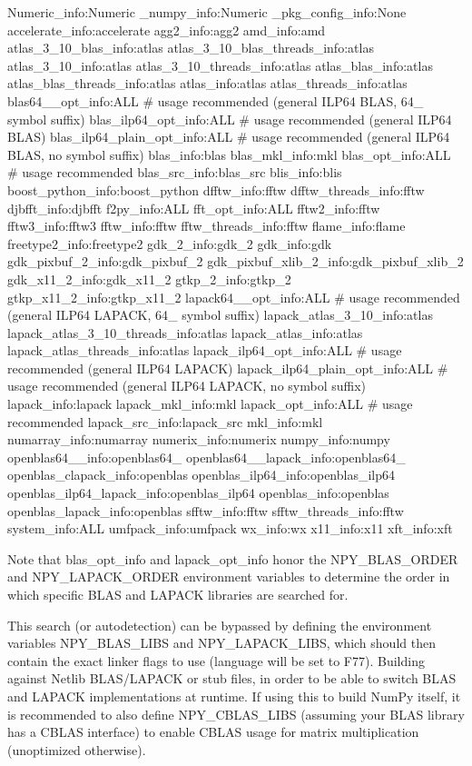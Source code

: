 \begin{DoxyVerb}
Numeric_info:Numeric
_numpy_info:Numeric
_pkg_config_info:None
accelerate_info:accelerate
agg2_info:agg2
amd_info:amd
atlas_3_10_blas_info:atlas
atlas_3_10_blas_threads_info:atlas
atlas_3_10_info:atlas
atlas_3_10_threads_info:atlas
atlas_blas_info:atlas
atlas_blas_threads_info:atlas
atlas_info:atlas
atlas_threads_info:atlas
blas64__opt_info:ALL               # usage recommended (general ILP64 BLAS, 64_ symbol suffix)
blas_ilp64_opt_info:ALL            # usage recommended (general ILP64 BLAS)
blas_ilp64_plain_opt_info:ALL      # usage recommended (general ILP64 BLAS, no symbol suffix)
blas_info:blas
blas_mkl_info:mkl
blas_opt_info:ALL                  # usage recommended
blas_src_info:blas_src
blis_info:blis
boost_python_info:boost_python
dfftw_info:fftw
dfftw_threads_info:fftw
djbfft_info:djbfft
f2py_info:ALL
fft_opt_info:ALL
fftw2_info:fftw
fftw3_info:fftw3
fftw_info:fftw
fftw_threads_info:fftw
flame_info:flame
freetype2_info:freetype2
gdk_2_info:gdk_2
gdk_info:gdk
gdk_pixbuf_2_info:gdk_pixbuf_2
gdk_pixbuf_xlib_2_info:gdk_pixbuf_xlib_2
gdk_x11_2_info:gdk_x11_2
gtkp_2_info:gtkp_2
gtkp_x11_2_info:gtkp_x11_2
lapack64__opt_info:ALL             # usage recommended (general ILP64 LAPACK, 64_ symbol suffix)
lapack_atlas_3_10_info:atlas
lapack_atlas_3_10_threads_info:atlas
lapack_atlas_info:atlas
lapack_atlas_threads_info:atlas
lapack_ilp64_opt_info:ALL          # usage recommended (general ILP64 LAPACK)
lapack_ilp64_plain_opt_info:ALL    # usage recommended (general ILP64 LAPACK, no symbol suffix)
lapack_info:lapack
lapack_mkl_info:mkl
lapack_opt_info:ALL                # usage recommended
lapack_src_info:lapack_src
mkl_info:mkl
numarray_info:numarray
numerix_info:numerix
numpy_info:numpy
openblas64__info:openblas64_
openblas64__lapack_info:openblas64_
openblas_clapack_info:openblas
openblas_ilp64_info:openblas_ilp64
openblas_ilp64_lapack_info:openblas_ilp64
openblas_info:openblas
openblas_lapack_info:openblas
sfftw_info:fftw
sfftw_threads_info:fftw
system_info:ALL
umfpack_info:umfpack
wx_info:wx
x11_info:x11
xft_info:xft

Note that blas_opt_info and lapack_opt_info honor the NPY_BLAS_ORDER
and NPY_LAPACK_ORDER environment variables to determine the order in which
specific BLAS and LAPACK libraries are searched for.

This search (or autodetection) can be bypassed by defining the environment
variables NPY_BLAS_LIBS and NPY_LAPACK_LIBS, which should then contain the
exact linker flags to use (language will be set to F77). Building against
Netlib BLAS/LAPACK or stub files, in order to be able to switch BLAS and LAPACK
implementations at runtime. If using this to build NumPy itself, it is
recommended to also define NPY_CBLAS_LIBS (assuming your BLAS library has a
CBLAS interface) to enable CBLAS usage for matrix multiplication (unoptimized
otherwise).


\end{DoxyVerb}
